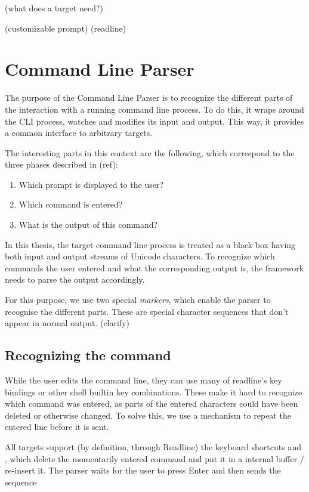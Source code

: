 \documentclass[paper=a4,abstract=on,cleardoublepage=empty,numbers=noenddot,toc=bib]{scrreprt}
\begin{document}
(what does a target need?)

(customizable prompt)
(readline)

\chapter{Command Line Parser}

The purpose of the Command Line Parser is to recognize the different parts of the interaction with a running command line process. To do this, it wraps around the \textsc{CLI} process, watches and modifies its input and output. This way, it provides a common interface to arbitrary targets.

The interesting parts in this context are the following, which correspond to the three phases described in (ref):

\begin{enumerate}
    \item Which prompt is displayed to the user?
    \item Which command is entered?
    \item What is the output of this command?
\end{enumerate}

In this thesis, the target command line process is treated as a black box having both input and output streams of Unicode characters. To recognize which commands the user entered and what the corresponding output is, the framework needs to parse the output accordingly.

For this purpose, we use two special \emph{markers}, which enable the parser to recognise the different parts. These are special character sequences that don't appear in normal output. (clarify)

\section{Recognizing the command}

While the user edits the command line, they can use many of readline's key bindings or other shell builtin key combinations. These make it hard to recognize which command was entered, as parts of the entered characters could have been deleted or otherwise changed. To solve this, we use a mechanism to repeat the entered line before it is sent.

All targets support (by definition, through Readline) the keyboard shortcuts  and , which delete the momentarily entered command and put it in a internal buffer / re-insert it. The parser waits for the user to press Enter and then sends the sequence
\end{document}
